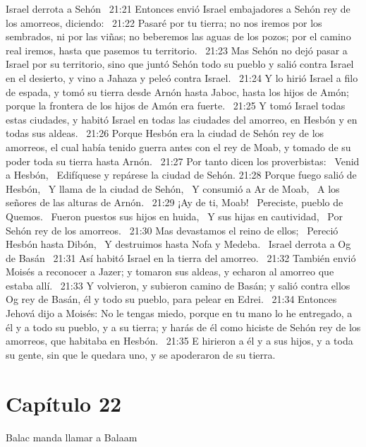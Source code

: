Israel derrota a Sehón   
21:21 Entonces envió Israel embajadores a Sehón rey de los amorreos, diciendo:  
21:22 Pasaré por tu tierra; no nos iremos por los sembrados, ni por las viñas; no beberemos las aguas de los pozos; por el camino real iremos, hasta que pasemos tu territorio.  
21:23 Mas Sehón no dejó pasar a Israel por su territorio, sino que juntó Sehón todo su pueblo y salió contra Israel en el desierto, y vino a Jahaza y peleó contra Israel.  
21:24 Y lo hirió Israel a filo de espada, y tomó su tierra desde Arnón hasta Jaboc, hasta los hijos de Amón; porque la frontera de los hijos de Amón era fuerte.  
21:25 Y tomó Israel todas estas ciudades, y habitó Israel en todas las ciudades del amorreo, en Hesbón y en todas sus aldeas.  
21:26 Porque Hesbón era la ciudad de Sehón rey de los amorreos, el cual había tenido guerra antes con el rey de Moab, y tomado de su poder toda su tierra hasta Arnón.  
21:27 Por tanto dicen los proverbistas:  
Venid a Hesbón,  
Edifíquese y repárese la ciudad de Sehón. 
21:28 Porque fuego salió de Hesbón,  
Y llama de la ciudad de Sehón,  
Y consumió a Ar de Moab,  
A los señores de las alturas de Arnón.  
21:29 ¡Ay de ti, Moab!  
Pereciste, pueblo de Quemos.  
Fueron puestos sus hijos en huida,  
Y sus hijas en cautividad,  
Por Sehón rey de los amorreos.  
21:30 Mas devastamos el reino de ellos;  
Pereció Hesbón hasta Dibón,  
Y destruimos hasta Nofa y Medeba.  
Israel derrota a Og de Basán   
21:31 Así habitó Israel en la tierra del amorreo.  
21:32 También envió Moisés a reconocer a Jazer; y tomaron sus aldeas, y echaron al amorreo que estaba allí.  
21:33 Y volvieron, y subieron camino de Basán; y salió contra ellos Og rey de Basán, él y todo su pueblo, para pelear en Edrei.  
21:34 Entonces Jehová dijo a Moisés: No le tengas miedo, porque en tu mano lo he entregado, a él y a todo su pueblo, y a su tierra; y harás de él como hiciste de Sehón rey de los amorreos, que habitaba en Hesbón.  
21:35 E hirieron a él y a sus hijos, y a toda su gente, sin que le quedara uno, y se apoderaron de su tierra.  
\section*{Capítulo 22 }
Balac manda llamar a Balaam  

